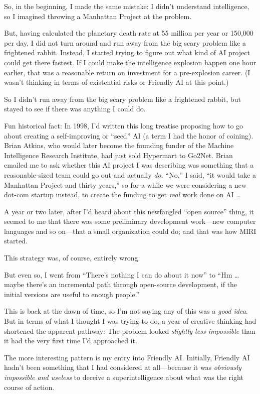 {
 So, in the beginning, I made the same mistake: I
didn't understand intelligence, so I imagined throwing
a Manhattan Project at the problem.}

{
 But, having calculated the planetary death rate at 55 million per
year or 150,000 per day, I did not turn around and run away from the
big scary problem like a frightened rabbit. Instead, I started trying
to figure out what kind of AI project could get there fastest. If I
could make the intelligence explosion happen one hour earlier, that was
a reasonable return on investment for a pre-explosion career. (I
wasn't thinking in terms of existential risks or
Friendly AI at this point.)}

{
 So I didn't run away from the big scary problem
like a frightened rabbit, but stayed to see if there was anything I
could do.}

{
 Fun historical fact: In 1998, I'd written this
long treatise proposing how to go about creating a self-improving or
``seed'' AI (a term I had the honor
of coining). Brian Atkins, who would later become the founding funder
of the Machine Intelligence Research Institute, had just sold Hypermart
to Go2Net. Brian emailed me to ask whether this AI project I was
describing was something that a reasonable-sized team could go out and
actually \textit{do.} ``No,'' I
said, ``it would take a Manhattan Project and thirty
years,'' so for a while we were considering a new
dot-com startup instead, to create the funding to get \textit{real}
work done on AI \ldots}

{
 A year or two later, after I'd heard about this
newfangled ``open source'' thing, it
seemed to me that there was some preliminary development work---new
computer languages and so on---that a small organization could do; and
that was how MIRI started.}

{
 This strategy was, of course, entirely wrong.}

{
 But even so, I went from
``There's nothing I can do about it
now'' to ``Hm \ldots maybe
there's an incremental path through open-source
development, if the initial versions are useful to enough
people.''}

{
 This is back at the dawn of time, so I'm not
saying any of this was a \textit{good idea}. But in terms of what I
thought I was trying to do, a year of creative thinking had shortened
the apparent pathway: The problem looked \textit{slightly less
impossible} than it had the very first time I'd
approached it.}

{
 The more interesting pattern is my entry into Friendly AI.
Initially, Friendly AI hadn't been something that I had
considered at all---because it was \textit{obviously impossible and
useless} to deceive a superintelligence about what was the right course
of action.}

